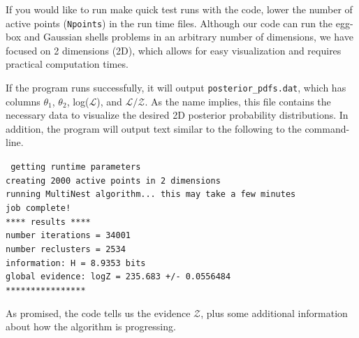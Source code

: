 \documentclass{article}
\begin{document}
\noindent If you would like to run make quick test runs with the code, lower the number of active points ({\tt Npoints}) in the run time files. Although our code can run the egg-box and Gaussian shells problems in an arbitrary number of dimensions, we have focused on 2 dimensions (2D), which allows for easy visualization and requires practical computation times. 

If the program runs successfully, it will output {\tt posterior\_pdfs.dat}, which has columns  $\theta_1$, $\theta_2$, log($\mathcal{L}$), and $\mathcal{L/Z}$. As the name implies, this file contains the necessary data to visualize the desired 2D posterior probability distributions. In addition, the program will output text similar to the following to the command-line. 

\begin{adjustwidth*}{1.2cm}{1.2cm}
{\tt
getting runtime parameters\\
creating 2000 active points in 2 dimensions\\
running MultiNest algorithm... this may take a few minutes\\
job complete!\\
**** results ****\\
number iterations = 34001\\
number reclusters = 2534\\
information: H =  8.9353 bits\\
global evidence: logZ = 235.683 +/- 0.0556484\\
****************}
\end{adjustwidth*}

As promised, the code tells us the evidence $\mathcal{Z}$, plus some additional information about how the algorithm is progressing. 



\end{document}
